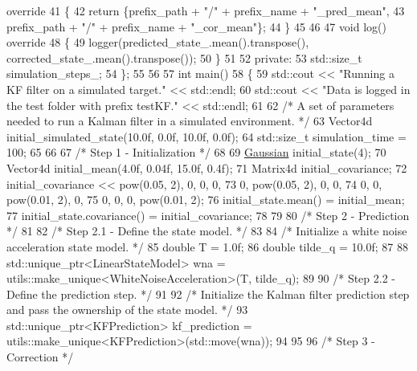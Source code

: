 \begin{DoxyCodeInclude}
{       override}
41 \textcolor{keyword}{    }\{
42         \textcolor{keywordflow}{return}  \{prefix\_path + \textcolor{stringliteral}{"/"} + prefix\_name + \textcolor{stringliteral}{"\_pred\_mean"},
43                  prefix\_path + \textcolor{stringliteral}{"/"} + prefix\_name + \textcolor{stringliteral}{"\_cor\_mean"}\};
44     \}
45 
46 
47     \textcolor{keywordtype}{void} log()\textcolor{keyword}{ override}
48 \textcolor{keyword}{    }\{
49         logger(predicted\_state\_.mean().transpose(), corrected\_state\_.mean().transpose());
50     \}
51 
52 \textcolor{keyword}{private}:
53     std::size\_t simulation\_steps\_;
54 \};
55 
56 
57 \textcolor{keywordtype}{int} main()
58 \{
59     std::cout << \textcolor{stringliteral}{"Running a KF filter on a simulated target."} << std::endl;
60     std::cout << \textcolor{stringliteral}{"Data is logged in the test folder with prefix testKF."} << std::endl;
61 
62     \textcolor{comment}{/* A set of parameters needed to run a Kalman filter in a simulated environment. */}
63     Vector4d initial\_simulated\_state(10.0f, 0.0f, 10.0f, 0.0f);
64     std::size\_t simulation\_time = 100;
65 
66 
67     \textcolor{comment}{/* Step 1 - Initialization */}
68 
69     \mbox{\hyperlink{classbfl_1_1Gaussian}{Gaussian}} initial\_state(4);
70     Vector4d initial\_mean(4.0f, 0.04f, 15.0f, 0.4f);
71     Matrix4d initial\_covariance;
72     initial\_covariance << pow(0.05, 2), 0,            0,            0,
73                           0,            pow(0.05, 2), 0,            0,
74                           0,            0,            pow(0.01, 2), 0,
75                           0,            0,            0,            pow(0.01, 2);
76     initial\_state.mean() = initial\_mean;
77     initial\_state.covariance() = initial\_covariance;
78 
79 
80     \textcolor{comment}{/* Step 2 - Prediction */}
81 
82     \textcolor{comment}{/* Step 2.1 - Define the state model. */}
83 
84     \textcolor{comment}{/* Initialize a white noise acceleration state model. */}
85     \textcolor{keywordtype}{double} T = 1.0f;
86     \textcolor{keywordtype}{double} tilde\_q = 10.0f;
87 
88     std::unique\_ptr<LinearStateModel> wna = utils::make\_unique<WhiteNoiseAcceleration>(T, tilde\_q);
89 
90     \textcolor{comment}{/* Step 2.2 - Define the prediction step. */}
91     
92     \textcolor{comment}{/* Initialize the Kalman filter prediction step and pass the ownership of the state model. */}
93     std::unique\_ptr<KFPrediction> kf\_prediction = utils::make\_unique<KFPrediction>(std::move(wna));
94 
95 
96     \textcolor{comment}{/* Step 3 - Correction */}

\end{DoxyCodeInclude}
